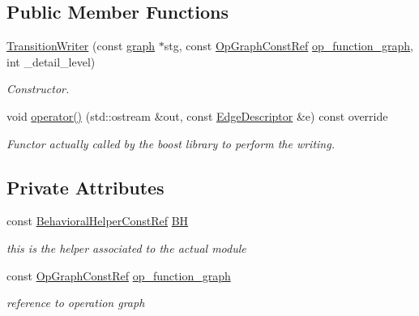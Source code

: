 \subsection*{Public Member Functions}
\begin{DoxyCompactItemize}
\item 
\hyperlink{classTransitionWriter_ad7a911971a9d8a0e6f1cf40c324a8862}{Transition\+Writer} (const \hyperlink{structgraph}{graph} $\ast$stg, const \hyperlink{op__graph_8hpp_a9a0b240622c47584bee6951a6f5de746}{Op\+Graph\+Const\+Ref} \hyperlink{classTransitionWriter_aa286544e78604b043971682c8dfc2c08}{op\+\_\+function\+\_\+graph}, int \+\_\+detail\+\_\+level)
\begin{DoxyCompactList}\small\item\em Constructor. \end{DoxyCompactList}\item 
void \hyperlink{classTransitionWriter_a6df1e95524ed8a5e00264577f75e54c5}{operator()} (std\+::ostream \&out, const \hyperlink{graph_8hpp_a9eb9afea34e09f484b21f2efd263dd48}{Edge\+Descriptor} \&e) const override
\begin{DoxyCompactList}\small\item\em Functor actually called by the boost library to perform the writing. \end{DoxyCompactList}\end{DoxyCompactItemize}
\subsection*{Private Attributes}
\begin{DoxyCompactItemize}
\item 
const \hyperlink{behavioral__helper_8hpp_aae973b54cac87eef3b27442aa3e1e425}{Behavioral\+Helper\+Const\+Ref} \hyperlink{classTransitionWriter_a7c2e326a9300c1c6c850f499f65495dd}{BH}
\begin{DoxyCompactList}\small\item\em this is the helper associated to the actual module \end{DoxyCompactList}\item 
const \hyperlink{op__graph_8hpp_a9a0b240622c47584bee6951a6f5de746}{Op\+Graph\+Const\+Ref} \hyperlink{classTransitionWriter_aa286544e78604b043971682c8dfc2c08}{op\+\_\+function\+\_\+graph}
\begin{DoxyCompactList}\small\item\em reference to operation graph \end{DoxyCompactList}\end{DoxyCompactItemize}
